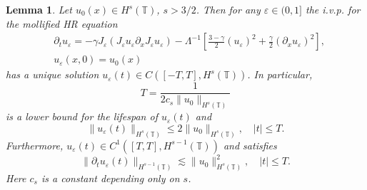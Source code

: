 \documentclass[12pt,reqno]{amsart}
\newcommand{\p}{\partial}
\newcommand{\ci}{\mathbb{T}}
\newcommand{\ee}{\varepsilon}
\theoremstyle{plain}  %
\newtheorem{lemma}{Lemma}
\theoremstyle{definition}
\begin{document}
%
%
\begin{lemma}
\label{hr_wp}
Let  $u_0(x) \in  H^s(\ci)$, $s >3/2$. Then for any $\ee\in (0, 1]$
the i.v.p. for the mollified HR equation 
%
%
%
\begin{align} \label{hr-moli-2}
& \partial_t  u_\ee =
-\gamma J_\ee (J_\ee u_\ee \partial_x  J_\ee  u_\ee) - \Lambda^{-1} \left
[\frac{3-\gamma}{2}(u_\ee)^2 + \frac{\gamma}{2}(\p_x u_\ee)^2
\right ], 
\\
&  u_\ee(x, 0) = u_0 (x)
\label{burgers-moli-data-2}
\end{align}
%
% 
%
%
%
%
%
%
has a unique solution $u_\ee( t)\in C([-T, T], H^s(\ci))$.  In particular,
%
%
%
\begin{equation} \label{life-est}
T
=
\frac{1}{ 2 c_s \|u_0\|_{H^s(\ci)}}
\end{equation}
%
%
%
is a lower bound for the lifespan of $u_\ee( t)$ and
%
%
%
\begin{equation}
\label{u-e-Hs-bound}
\|u_\ee(t)\|_{H^s(\ci)}
\le
2 \|u_0 \|_{H^s(\ci)},
\quad
|t| \le T.
\end{equation}
%
%
%
Furthermore,  $u_\ee( t)\in C^1([T, T], H^{s-1}(\ci))$ and satisfies
%
%
\begin{equation}
\label{dt-u-e-Hs-bound}
\|\p_t u_\ee(t)\|_{H^{s-1}(\ci)}
\lesssim
\|u_0 \|_{H^s(\ci)}^2,
\quad
|t| \le T.
\end{equation}
%
%
% 
Here  $c_s$ is a constant depending only on $s$.
\end{lemma}
%
%
%
%
\end{document}
